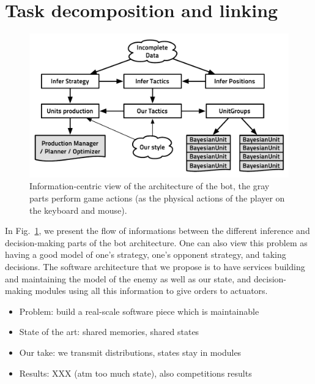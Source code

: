 \section{Task decomposition and linking}
\begin{figure}[!ht]
\begin{center}
\includegraphics[width=13cm]{images/starcraft_bbq_concept_12-04-2012.pdf}
\end{center}
\label{fig:conceptbbq}
\caption{Information-centric view of the architecture of the bot, the gray parts perform game actions (as the physical actions of the player on the keyboard and mouse).}
\end{figure}

In Fig.~\ref{fig:conceptbbq}, we present the flow of informations between the different inference and decision-making parts of the bot architecture. One can also view this problem as having a good model of one's strategy, one's opponent strategy, and taking decisions. The software architecture that we propose is to have services building and maintaining the model of the enemy as well as our state, and decision-making modules using all this information to give orders to actuators.

\begin{itemize}
\item Problem: build a real-scale software piece which is maintainable
\item State of the art: shared memories, shared states
\item Our take: we transmit distributions, states stay in modules
\item Results: XXX (atm too much state), also competitions results
\end{itemize}

